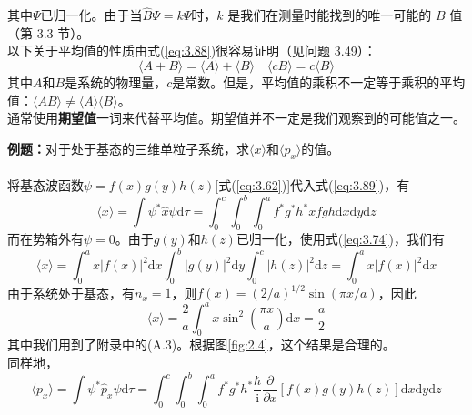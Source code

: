 	其中$\Psi$已归一化。由于当$\hat{B}\Psi = k\Psi$时，$k$ 是我们在测量时能找到的唯一可能的 $B$ 值（第 3.3 节）。\\
	\indent 以下关于平均值的性质由式(\ref{eq:3.88})很容易证明（见问题 3.49）：
	\begin{equation}
		\boxed{
			\langle A + B \rangle = \langle A \rangle + \langle B \rangle
		}
		\quad
		\boxed{
			\langle cB \rangle = c\langle B \rangle
		}
		\label{eq:3.90}
	\end{equation}
	其中$A$和$B$是系统的物理量，$c$是常数。但是，平均值的乘积不一定等于乘积的平均值：$\langle AB \rangle \neq \langle A \rangle\langle B \rangle$。\\
	\indent 通常使用\textbf{期望值}一词来代替平均值。期望值并不一定是我们观察到的可能值之一。
	\begin{examplebox}
		\textbf{例题：}对于处于基态的三维单粒子系统，求$\langle x \rangle$和$\langle p_x \rangle$的值。\\
		\\
		将基态波函数$\psi=f\left(x\right)g\left(y\right)h\left(z\right)$[式(\ref{eq:3.62})]代入式(\ref{eq:3.89})，有
		\begin{equation*}
			\langle x \rangle = \int \psi^{\ast}\hat{x}\psi \mathrm{d}\tau = \int_{0}^{c}\int_{0}^{b}\int_{0}^{a}f^{\ast}g^{\ast}h^{\ast} x fgh\mathrm{d}x\mathrm{d}y\mathrm{d}z
		\end{equation*}
		而在势箱外有$\psi = 0$。由于$g\left(y\right)$和$h\left(z\right)$已归一化，使用式(\ref{eq:3.74})，我们有
		\begin{equation*}
			\langle x \rangle = \int_{0}^{a} x\left|f\left(x\right)\right|^{2}\mathrm{d}x \int_{0}^{b}\left|g\left(y\right)\right|^{2}\mathrm{d}y \int_{0}^{c}\left|h\left(z\right)\right|^{2}\mathrm{d}z = \int_{0}^{a} x\left|f\left(x\right)\right|^{2}\mathrm{d}x
		\end{equation*}
		由于系统处于基态，有$n_x=1$，则$f\left(x\right) = \left(2/a\right)^{1/2}\sin\left(\pi x/a\right)$，因此
		\begin{equation}
			\langle x \rangle = \frac{2}{a}\int_{0}^{a} x\sin^{2}\left(\frac{\pi x}{a}\right)\mathrm{d}x = \frac{a}{2}
			\label{eq:3.91}
		\end{equation}
		其中我们用到了附录中的(A.3)。根据图\ref{fig:2.4}，这个结果是合理的。\\
		\indent 同样地，
		\begin{equation*}
			\langle p_x \rangle = \int \psi^{\ast}\hat{p}_x\psi \mathrm{d}\tau = \int_{0}^{c}\int_{0}^{b}\int_{0}^{a}f^{\ast}g^{\ast}h^{\ast} \frac{\hbar}{\mathrm{i}}\frac{\partial}{\partial x}\left[f\left(x\right)g\left(y\right)h\left(z\right)\right]\mathrm{d}x\mathrm{d}y\mathrm{d}z

\end{equation*}
\end{examplebox}
